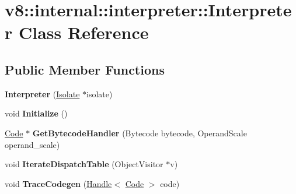 \hypertarget{classv8_1_1internal_1_1interpreter_1_1_interpreter}{}\section{v8\+:\+:internal\+:\+:interpreter\+:\+:Interpreter Class Reference}
\label{classv8_1_1internal_1_1interpreter_1_1_interpreter}
\subsection*{Public Member Functions}
\begin{DoxyCompactItemize}
\item 
{\bfseries Interpreter} (\hyperlink{classv8_1_1internal_1_1_isolate}{Isolate} $\ast$isolate)\hypertarget{classv8_1_1internal_1_1interpreter_1_1_interpreter_af89f24c8ab451e62383e262fc3c0fdbd}{}\label{classv8_1_1internal_1_1interpreter_1_1_interpreter_af89f24c8ab451e62383e262fc3c0fdbd}

\item 
void {\bfseries Initialize} ()\hypertarget{classv8_1_1internal_1_1interpreter_1_1_interpreter_a38ec4f6bc9bbac84c6834847dcbafecb}{}\label{classv8_1_1internal_1_1interpreter_1_1_interpreter_a38ec4f6bc9bbac84c6834847dcbafecb}

\item 
\hyperlink{classv8_1_1internal_1_1_code}{Code} $\ast$ {\bfseries Get\+Bytecode\+Handler} (Bytecode bytecode, Operand\+Scale operand\+\_\+scale)\hypertarget{classv8_1_1internal_1_1interpreter_1_1_interpreter_a57912bf04ad5af300efab6df486dbabb}{}\label{classv8_1_1internal_1_1interpreter_1_1_interpreter_a57912bf04ad5af300efab6df486dbabb}

\item 
void {\bfseries Iterate\+Dispatch\+Table} (Object\+Visitor $\ast$v)\hypertarget{classv8_1_1internal_1_1interpreter_1_1_interpreter_ad0efe8331772a4821b9ca69804e01b62}{}\label{classv8_1_1internal_1_1interpreter_1_1_interpreter_ad0efe8331772a4821b9ca69804e01b62}

\item 
void {\bfseries Trace\+Codegen} (\hyperlink{classv8_1_1internal_1_1_handle}{Handle}$<$ \hyperlink{classv8_1_1internal_1_1_code}{Code} $>$ code)\hypertarget{classv8_1_1internal_1_1interpreter_1_1_interpreter_a9b4fb6cfff77bfae580b6156d308b54a}{}\label{classv8_1_1internal_1_1interpreter_1_1_interpreter_a9b4fb6cfff77bfae580b6156d308b54a}


\end{DoxyCompactItemize}
